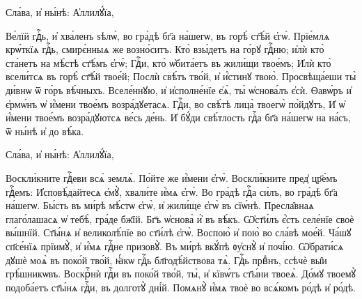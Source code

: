 \hKv Сла́ва, и҆ ны́нѣ: А҆ллилꙋ́їа,  





\cuLettrine
Ве́лїй гдⷭ҇ь, и҆ хва́ленъ ѕѣлѡ̀, во гра́дѣ бг҃а  на́шегѡ, въ горѣ̀ ст҃ѣ́й є҆гѡ̀. 
\hKv Прїе́млѧ крѡ́ткїѧ  гдⷭ҇ь, смирє́нныѧ же возно́ситъ. 
\hKv Кто̀ взы́детъ на  го́рꙋ гдⷭ҇ню; и҆лѝ кто̀ ста́нетъ на мѣ́стѣ ст҃ѣ́мъ  є҆гѡ̀; 
\hKv Гдⷭ҇и, кто̀ ѡ҆бита́етъ въ жили́щи твое́мъ; 
\hKv  И҆лѝ кто̀ всели́тсѧ въ горѣ̀ ст҃ѣ́й твое́й; 
\hKv Послѝ  свѣ́тъ тво́й, и҆ и҆́стинꙋ твою̀. 
\hKv Просвѣща́еши ты̀  ди́внѡ ѿ  го́ръ вѣ́чныхъ. 
\hKv  Вселе́ннꙋю, и҆ и҆сполне́нїе є҆ѧ̀, ты̀ ѡ҆снова́лъ є҆сѝ.  
\hKv Ѳавѡ́ръ и҆ є҆рмѡ́нъ ѡ҆ и҆́мени твое́мъ возра́дꙋетасѧ.  
\hKv Гдⷭ҇и, во свѣ́тѣ лица̀ твоегѡ̀ по́йдꙋтъ, 
\hKv И҆ ѡ҆  и҆́мени твое́мъ возра́дꙋютсѧ ве́сь де́нь. 
\hKv И҆ бꙋ́ди  свѣ́тлость гдⷭ҇а бг҃а на́шегѡ на на́съ, ѿ ны́нѣ и҆ до  вѣ́ка.  

\hKv Сла́ва, и҆ ны́нѣ: А҆ллилꙋ́їа,  






\cuLettrine
Воскли́кните гдⷭ҇еви всѧ̀ землѧ̀. 
\hKv По́йте же  и҆́мени є҆гѡ̀. 
\hKv Воскли́кните пред̾ цр҃е́мъ гдⷭ҇емъ:  
\hKv И҆сповѣ́дайтесѧ є҆мꙋ̀, хвали́те и҆́мѧ є҆гѡ̀. 
\hKv Во  гра́дѣ гдⷭ҇а си́лъ, во гра́дѣ бг҃а на́шегѡ. 
\hKv Бы́сть въ  ми́рѣ мѣ́стѡ є҆гѡ̀, и҆ жили́ще є҆гѡ̀  въ сїѡ́нѣ. 
\hKv Пресла̑внаѧ глаго́лашасѧ ѡ҆  тебѣ̀, гра́де бж҃їй. 
\hKv Бг҃ъ ѡ҆снова̀ и҆̀ въ вѣ́къ. 
\hKv  Ѡ҆ст҃и́лъ є҆́сть селе́нїе своѐ вы́шнїй. 
\hKv Ст҃ы́нѧ и҆  великолѣ́пїе во ст҃и́лѣ є҆гѡ̀. 
\hKv Воспою̀ и҆ пою̀ во  сла́вѣ мое́й. 
\hKv Ча́шꙋ сп҃се́нїѧ прїимꙋ̀, и҆ и҆́мѧ гдⷭ҇не  призовꙋ̀. 
\hKv Въ ми́рѣ вкꙋ́пѣ ᲂу҆снꙋ̀ и҆ почі́ю. 
\hKv  Ѡ҆брати́сѧ дꙋшѐ моѧ̀ въ поко́й тво́й, ꙗ҆́кѡ гдⷭ҇ь  бл҃годѣ́йствова тѧ̀. 
\hKv Гдⷭ҇ь првⷣнъ, ссѣчѐ вы̑и  грѣ́шникѡвъ. 
\hKv Воскрⷭ҇нѝ гдⷭ҇и въ поко́й тво́й, ты̀, и҆  кївѡ́тъ ст҃ы́ни твоеѧ̀. 
\hKv До́мꙋ твоемꙋ̀ подоба́етъ  ст҃ы́нѧ гдⷭ҇и, въ долготꙋ̀ дні́й. 
\hKv Помѧнꙋ̀ и҆́мѧ твоѐ  во всѧ́комъ ро́дѣ и҆ ро́дѣ.  

